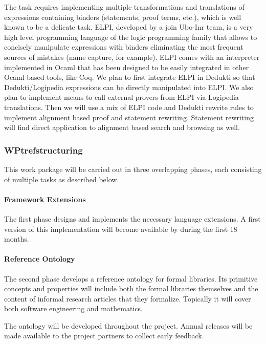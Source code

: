 The task requires implementing multiple transformations and
translations of expressions containing binders (statements, proof
terms, etc.), which is well known to be a delicate task. ELPI,
developed by a join Ubo-Inr team, is a very high level programming
language of the logic programming family that allows to concisely
manipulate expressions with binders eliminating the most frequent
sources of mistakes (name capture, for example). ELPI comes with an
interpreter implemented in Ocaml that has been designed to be easily
integrated in other Ocaml based tools, like Coq. We plan to first
integrate ELPI in Dedukti so that Dedukti/Logipedia expressions can be
directly manipulated into ELPI. We also plan to implement means to
call external provers from ELPI via Logipedia translations. Then we
will use a mix of ELPI code and Dedukti rewrite rules to implement
alignment based proof and statement rewriting. Statement rewriting
will find direct application to alignment based search and browsing as
well.

\subsubsection{WPtref{structuring}}

This work package will be carried out in three overlapping phases, each consisting of multiple tasks as described below.


\paragraph{Framework Extensions}
The first phase designs and implements the necessary language extensions.
A first version of this implementation will become available by during the first 18 months.



\paragraph{Reference Ontology}
The second phase develops a reference ontology for formal libraries.
Its primitive concepts and properties will include both the formal libraries themselves and the content of informal research articles that they formalize.
Topically it will cover both software engineering and mathematics.

The ontology will be developed throughout the project.
Annual releases will be made available to the project partners to collect early feedback.

